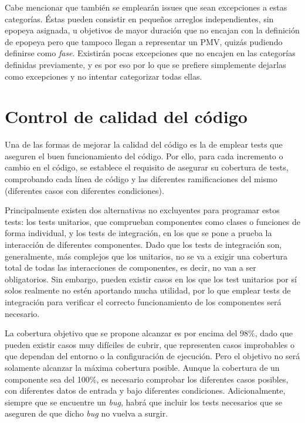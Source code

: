 Cabe mencionar que también se emplearán issues que sean excepciones a estas categorías. Éstas pueden consistir en pequeños arreglos independientes, sin epopeya asignada, u objetivos de mayor duración que no encajan con la definición de epopeya pero que tampoco llegan a representar un PMV, quizás pudiendo definirse como \textit{fase}. Existirán pocas excepciones que no encajen en las categorías definidas previamente, y es por eso por lo que se prefiere simplemente dejarlas como excepciones y no intentar categorizar todas ellas.

\section{Control de calidad del código}

Una de las formas de mejorar la calidad del código es la de emplear tests que aseguren el buen funcionamiento del código. Por ello, para cada incremento o cambio en el código, se establece el requisito de asegurar su cobertura de tests, comprobando cada línea de código y las diferentes ramificaciones del mismo (diferentes casos con diferentes condiciones).

Principalmente existen dos alternativas no excluyentes para programar estos tests: los tests unitarios, que comprueban componentes como clases o funciones de forma individual, y los tests de integración, en los que se pone a prueba la interacción de diferentes componentes. Dado que los tests de integración son, generalmente, más complejos que los unitarios, no se va a exigir una cobertura total de todas las interacciones de componentes, es decir, no van a ser obligatorios. Sin embargo, pueden existir casos en los que los test unitarios por sí solos realmente no estén aportando mucha utilidad, por lo que emplear tests de integración para verificar el correcto funcionamiento de los componentes será necesario.

La cobertura objetivo que se propone alcanzar es por encima del 98\%, dado que pueden existir casos muy difíciles de cubrir, que representen casos improbables o que dependan del entorno o la configuración de ejecución. Pero el objetivo no será solamente alcanzar la máxima cobertura posible. Aunque la cobertura de un componente sea del 100\%, es necesario comprobar los diferentes casos posibles, con diferentes datos de entrada y bajo diferentes condiciones. Adicionalmente, siempre que se encuentre un \textit{bug}, habrá que incluir los tests necesarios que se aseguren de que dicho \textit{bug} no vuelva a surgir.

